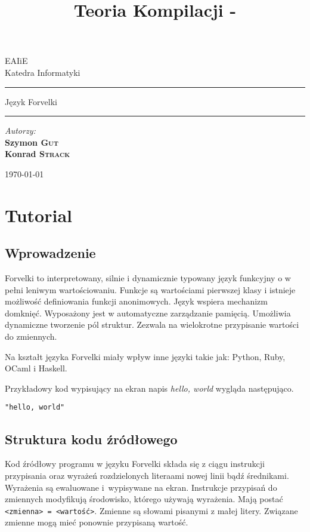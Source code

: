 \documentclass[4paper,10pt]{article}
\title{Teoria Kompilacji - \labtitle}
\author{\labauthors}
\def \labtitle {Język Forvelki}
\begin{document}
  \begin{titlepage}
    \begin{center}
      \vskip 1cm
      EAIiE \\ Katedra Informatyki \vskip 3cm

      \hrule \medskip
      \huge \labtitle
 \\ \smallskip
      \normalsize
      \smallskip \hrule


    \end{center}

      \vskip 10cm
      \normalsize
      \noindent \emph{Autorzy:}\smallskip\\
		\textbf{Szymon \textsc{Gut}}\\
		\textbf{Konrad \textsc{Strack}}

    \begin{center}
      \vfill
      \today
    \end{center}

  \end{titlepage}

\setcounter{section}{0}

\section{Tutorial}

\subsection{Wprowadzenie}
Forvelki to interpretowany, silnie i dynamicznie typowany język funkcyjny o w pełni leniwym wartościowaniu.
Funkcje są wartościami pierwszej klasy i istnieje możliwość definiowania funkcji anonimowych.
Język wspiera mechanizm domknięć.
Wyposażony jest w automatyczne zarządzanie pamięcią.
Umożliwia dynamiczne tworzenie pól struktur.
Zezwala na wielokrotne przypisanie wartości do zmiennych.

Na kształt języka Forvelki miały wpływ inne języki takie jak: Python, Ruby, OCaml i Haskell.

Przykładowy kod wypisujący na ekran napis \emph{hello, world} wygląda następująco.
\begin{lstlisting}
"hello, world"
\end{lstlisting}


\subsection{Struktura kodu źródłowego}
Kod źródłowy programu w języku Forvelki składa się z ciągu instrukcji przypisania oraz wyrażeń rozdzielonych literaami nowej linii bądź średnikami.
Wyrażenia są ewaluowane i~wypisywane na ekran.
Instrukcje przypisań do zmiennych modyfikują środowisko, którego używają wyrażenia.
Mają postać \texttt{<zmienna>~=~<wartość>}.
Zmienne są słowami pisanymi z małej litery.
Związane zmienne mogą mieć ponownie przypisaną wartość.
\end{document}
